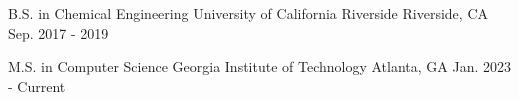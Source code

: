 

\begin{cventries}

  \cventry
    {B.S. in Chemical Engineering} %
    {University of California Riverside} %
    {Riverside, CA} %
    {Sep. 2017 - 2019} %
    {}

  \cventry
    {M.S. in Computer Science} %
    {Georgia Institute of Technology} %
    {Atlanta, GA} %
    {Jan. 2023 - Current} %
    {}

\end{cventries}
